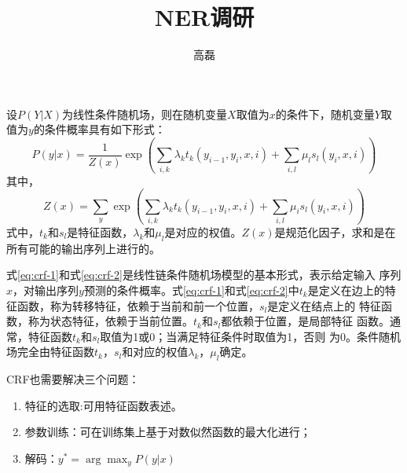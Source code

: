 \documentclass[a4paper,UTF8,no-math]{ctexart}
\title{NER调研}
\author{高磊}
\date{\zhtoday}
\begin{document}

	
	设$P(Y|X)$为线性条件随机场，则在随机变量$X$取值为$x$的条件下，随机变量$Y$取值为$y$的条件概率具有如下形式：\begin{equation}
P(y | x)=\frac{1}{Z(x)} \exp \left(\sum_{i, k} \lambda_{k} t_{k}\left(y_{i-1},y_{i}, x, i\right)+\sum_{i, l} \mu_{l} s_{l}\left(y_{i}, x, i\right)\right)
\label{eq:crf-1}
	\end{equation}
	其中，\begin{equation}
Z(x)=\sum_{y} \exp \left(\sum_{i, k} \lambda_{k} t_{k}\left(y_{i-1}, y_{i}, x, i\right)+\sum_{i, l} \mu_{i} s_{l}\left(y_{i}, x, i\right)\right)
\label{eq:crf-2}
	\end{equation}
	式中，$t_{k}$和$s_{l}$是特征函数，$\lambda_{k}$和$\mu_{l}$是对应的权值。$Z(x)$是规范化因子，求和是在所有可能的输出序列上进行的。
	
	式\eqref{eq:crf-1}和式\eqref{eq:crf-2}是线性链条件随机场模型的基本形式，表示给定输入
序列$x$，对输出序列$y$预测的条件概率。式\eqref{eq:crf-1}和式\eqref{eq:crf-2}中$t_{k}$是定义在边上的特征函数，称为转移特征，依赖于当前和前一个位置，$s_{l}$是定义在结点上的
特征函数，称为状态特征，依赖于当前位置。$t_{k}$和$s_{l}$都依赖于位置，是局部特征
函数。通常，特征函数$t_{k}$和$s_{l}$取值为1或0；当满足特征条件时取值为1，否则
为0。条件随机场完全由特征函数$t_{k}$，$s_{l}$和对应的权值$\lambda_{k}$，$\mu_{l}$确定。

	CRF也需要解决三个问题：
	\begin{enumerate}
		\item 特征的选取:可用特征函数表述。
		\item 参数训练：可在训练集上基于对数似然函数的最大化进行；
		\item 解码：$y^{*} = \arg \max_{y} P(y|x)$
	\end{enumerate}
	
\end{document}
